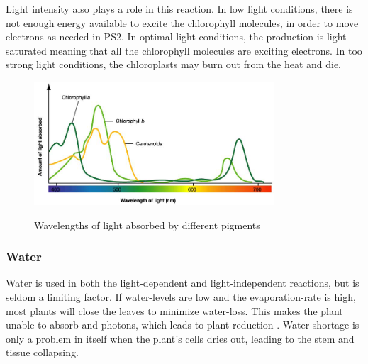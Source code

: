 Light intensity also plays a role in this reaction. In low light conditions, there is not enough energy available to excite the chlorophyll molecules, in order to move electrons as needed in PS2. In optimal light conditions, the production is light-saturated meaning that all the chlorophyll molecules are exciting electrons. In too strong light conditions, the chloroplasts may burn out from the heat and die.  

\begin{figure}
        \centering
        \includegraphics[width=0.8\textwidth]{img/photosynthesis/absorption-spectrum.png}
        \caption{Wavelengths of light absorbed by different pigments}
        \citep{uicbiology}
        \label{fig:wavelengthabsorbtion}
\end{figure}

\subsubsection{Water}
Water is used in both the light-dependent and light-independent reactions, but is seldom a limiting factor. If water-levels are low and the evaporation-rate is high, most plants will close the leaves to minimize water-loss. This makes the plant unable to absorb  and photons, which leads to plant reduction \citep{bi2}. Water shortage is only a problem in itself when the plant's cells dries out, leading to the stem and tissue collapsing. 




